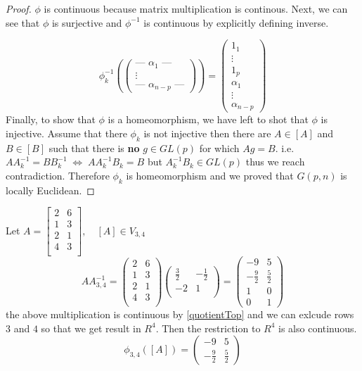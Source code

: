 \documentclass[11pt,a4paper]{report}
\begin{document}
\begin{proof}
$\phi$ is continuous because matrix multiplication is continous. Next, we can see that $\phi$ is surjective and $\phi^{-1}$ is continuous by explicitly defining inverse.

$$\phi_{k}^{-1}(\begin{pmatrix} \text{--- } \alpha_{1} \text{ ---}  \\ \vdots \\ \text{--- }  \alpha_{n-p} \text{ ---} \end{pmatrix}) =
\begin{pmatrix} 1_1 \\ \vdots  \\ 1_p \\ \alpha_1 \\ \vdots \\  \alpha_{n-p}  \end{pmatrix} $$
Finally, to show that $\phi$ is a homeomorphism,
we have left to shot that $\phi$ is injective. 
\newline
Assume that there $\phi_{k}$ is not injective then there are $A \in [A]$ and $B \in [B]$ such that there is \textbf{no} $g \in GL(p)$
for which $A g =  B$. i.e. $A A_{k}^{-1} = B B_{k}^{-1} \; \iff  \; 
 A A_{k}^{-1} B_{k} = B$ but $A_{k}^{-1} B_{k} \in GL(p)$ thus we reach contradiction.
Therefore $\phi_{k}$ is homeomorphism and we proved that $G(p,n)$ is locally Euclidean.
\end{proof}
\begin{Ex} \label{ex1}
    Let $A = \begin{bmatrix}
        2 & 6 \\
        1 & 3 \\
        2 & 1 \\
        4 & 3 \\
    \end{bmatrix}, \quad [ A ] \in V_{3,4}$
    $$ A A_{3,4}^{-1} =  \begin{pmatrix} 2 & 6 \\ 1 & 3 \\ 2 & 1 \\ 4 & 3 \\ \end{pmatrix} \begin{pmatrix} \frac{3}{2} & -\frac{1}{2} \\ -2 & 1 \\ \end{pmatrix}
    = \begin{pmatrix} -9 & 5 \\ -\frac{9}{2} & \frac{5}{2} \\ 1 & 0 \\ 0 & 1 \end{pmatrix}
    $$
    the above multiplication is continuous by \ref{quotientTop} and we can exlcude rows $3$ and $4$ so that we get result in $R^4$.
    Then the restriction to $R^4$ is also continuous.
    $$ \phi_{3,4}([A]) = \begin{pmatrix} -9 & 5 \\ -\frac{9}{2} & \frac{5}{2} \end{pmatrix} $$
\end{Ex}
\end{document}
